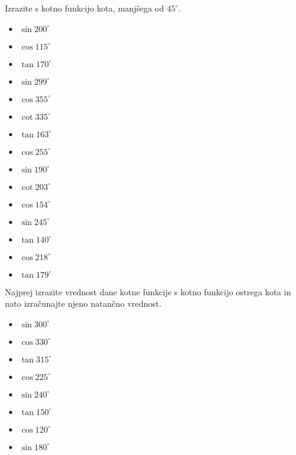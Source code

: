         
            \begin{naloga}
                Izrazite s kotno funkcijo kota, manjšega od $45^\circ$.
                \begin{multicols}{5}
                \begin{itemize}
                            \item $\sin{200^\circ} $ 
                            \item $\cos{115^\circ} $ 
                            \item $\tan{170^\circ} $ 
                            \item $\sin{299^\circ} $ 
                            \item $\cos{355^\circ} $ 
                            \item $\cot{335^\circ} $ 
                            \item $\tan{163^\circ} $ 
                            \item $\cos{255^\circ} $ 
                            \item $\sin{190^\circ} $ 
                            \item $\cot{203^\circ} $ 
                            \item $\cos{154^\circ} $ 
                            \item $\sin{245^\circ} $ 
                            \item $\tan{140^\circ} $ 
                            \item $\cos{218^\circ} $ 
                            \item $\tan{179^\circ} $ 
                \end{itemize}
            \end{multicols}
            \end{naloga}

        


        
            \begin{naloga}
                Najprej izrazite vrednost dane kotne funkcije s kotno funkcijo ostrega kota in nato izračunajte njeno natančno vrednost.
                \begin{multicols}{3}
                \begin{itemize}
                            \item $\sin{300^\circ} $ 
                            \item $\cos{330^\circ} $ 
                            \item $\tan{315^\circ} $ 
                            \item $\cos{225^\circ} $ 
                            \item $\sin{240^\circ} $ 
                            \item $\tan{150^\circ} $ 
                            \item $\cos{120^\circ} $ 
                            \item $\sin{180^\circ} $ 
                \end{itemize}
            \end{multicols}
            \end{naloga}

